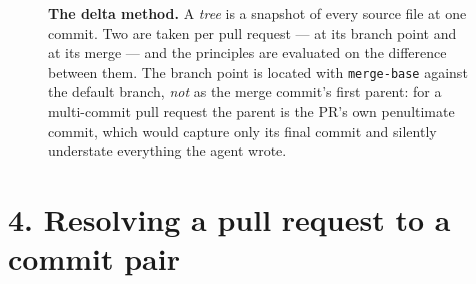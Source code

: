 \documentclass[11pt]{article}
\begin{document}
\begin{figure}[h]
{}
\caption{\textbf{The delta method.} A \emph{tree} is a snapshot of every source file at one
commit. Two are taken per pull request --- at its branch point and at its merge --- and the
principles are evaluated on the difference between them. The branch point is located with
\texttt{merge-base} against the default branch, \emph{not} as the merge commit's first parent:
for a multi-commit pull request the parent is the PR's own penultimate commit, which would
capture only its final commit and silently understate everything the agent wrote.}
\end{figure}

\clearpage

\section*{4. Resolving a pull request to a commit pair}
\end{document}
